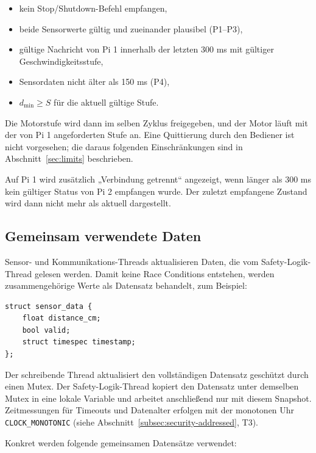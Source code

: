 \begin{itemize}
    \item kein Stop/Shutdown-Befehl empfangen,
    \item beide Sensorwerte gültig und zueinander plausibel (P1--P3),
    \item gültige Nachricht von Pi 1 innerhalb der letzten 300 ms mit gültiger Geschwindigkeitsstufe,
    \item Sensordaten nicht älter als 150 ms (P4),
    \item $d_{\min} \geq S$ für die aktuell gültige Stufe.
\end{itemize}

Die Motorstufe wird dann im selben Zyklus freigegeben, und der Motor läuft mit
der von Pi 1 angeforderten Stufe an. Eine Quittierung durch den Bediener
ist nicht vorgesehen; die daraus folgenden Einschränkungen sind in
Abschnitt~\ref{sec:limits} beschrieben.

Auf Pi 1 wird zusätzlich „Verbindung getrennt“ angezeigt, wenn länger
als 300 ms kein gültiger Status von Pi 2 empfangen wurde. Der zuletzt
empfangene Zustand wird dann nicht mehr als aktuell dargestellt.

\subsection{Gemeinsam verwendete Daten}
\label{sec:shared}

Sensor- und Kommunikations-Threads aktualisieren Daten, die vom
Safety-Logik-Thread gelesen werden. Damit keine Race Conditions entstehen,
werden zusammengehörige Werte als Datensatz behandelt, zum Beispiel:

\begin{verbatim}
struct sensor_data {
    float distance_cm;
    bool valid;
    struct timespec timestamp;
};
\end{verbatim}

Der schreibende Thread aktualisiert den vollständigen Datensatz geschützt durch
einen Mutex. Der Safety-Logik-Thread kopiert den Datensatz unter demselben Mutex
in eine lokale Variable und arbeitet anschließend nur mit diesem Snapshot.
Zeitmessungen für Timeouts und Datenalter erfolgen mit der monotonen Uhr
\texttt{CLOCK\_MONOTONIC} (siehe Abschnitt~\ref{subsec:security-addressed}, T3).

Konkret werden folgende gemeinsamen Datensätze verwendet:

